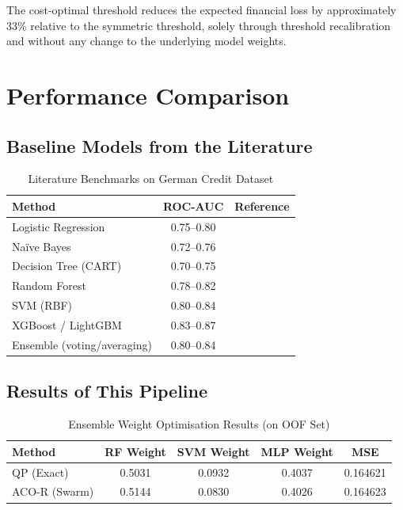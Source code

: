 \documentclass[12pt,a4paper]{article}
\begin{document}
The cost-optimal threshold reduces the expected financial loss by approximately 33\%
relative to the symmetric threshold, solely through threshold recalibration and without
any change to the underlying model weights.

\pagebreak
\section{Performance Comparison}

\subsection{Baseline Models from the Literature}

\begin{table}[H]
\centering
\caption{Literature Benchmarks on German Credit Dataset}
\label{tab:literature}
\begin{tabular}{lcc}
\toprule
\textbf{Method} & \textbf{ROC-AUC} & \textbf{Reference} \\
\midrule
Logistic Regression & 0.75--0.80 & \citet{lessmann2015benchmarking} \\
Na\"ive Bayes & 0.72--0.76 & \citet{west2000neural} \\
Decision Tree (CART) & 0.70--0.75 & \citet{brown2012experimental} \\
Random Forest & 0.78--0.82 & \citet{lessmann2015benchmarking} \\
SVM (RBF) & 0.80--0.84 & \citet{lessmann2015benchmarking} \\
XGBoost / LightGBM & 0.83--0.87 & \citet{chen2016xgboost} \\
Ensemble (voting/averaging) & 0.80--0.84 & \citet{brown2012experimental} \\
\bottomrule
\end{tabular}
\end{table}

\subsection{Results of This Pipeline}

\begin{table}[H]
\centering
\caption{Ensemble Weight Optimisation Results (on OOF Set)}
\label{tab:weights}
\begin{tabular}{lcccc}
\toprule
\textbf{Method} & \textbf{RF Weight} & \textbf{SVM Weight} & \textbf{MLP Weight} & \textbf{MSE} \\
\midrule
QP (Exact)      & 0.5031 & 0.0932 & 0.4037 & 0.164621 \\
ACO-R (Swarm)   & 0.5144 & 0.0830 & 0.4026 & 0.164623 \\
\bottomrule
\end{tabular}
\end{table}
\end{document}

